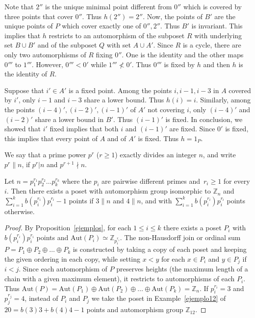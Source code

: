 \documentclass[ALCO,published]{cedram}
\renewcommand{\varphi}{h}
\newcommand{\Z}{\mathbb{Z}}
\newcommand{\aut}{\textrm{Aut}}
\begin{document}
\begin{ej}
Note that $2''$ is the unique minimal point different from $0''$ which is covered by three points that cover $0''$. Thus $\varphi(2'')=2''$. Now, the points of $B'$ are the unique points of $P$ which cover exactly one of $0'',2''$. Thus $B'$ is invariant. This implies that $\varphi$ restricts to an automorphism of the subposet $R$ with underlying set $B\cup B'$ and of the subposet $Q$ with set $A\cup A'$.
Since $R$ is a cycle, there are only two automorphisms of $R$ fixing $0''$. One is the identity and the other maps $0'''$ to $1'''$. However, $0'''<0'$ while $1'''\nless 0'$. Thus $0'''$ is fixed by $\varphi$ and then $\varphi$ is the identity of $R$. 

Suppose that $i'\in A'$ is a fixed point. Among the points $i,i-1,i-3$ in $A$ covered by $i'$, only $i-1$ and $i-3$ share a lower bound. Thus $\varphi(i)=i$. Similarly, among the points $(i-4)',(i-2)',(i-1)'$ of $A'$ not covering $i$, only $(i-4)'$ and $(i-2)'$ share a lower bound in $B'$. Thus $(i-1)'$ is fixed. In conclusion, we showed that $i'$ fixed implies that both $i$ and $(i-1)'$ are fixed. Since $0'$ is fixed, this implies that every point of $A$ and of $A'$ is fixed. Thus $\varphi=1_P$.  

\end{ej}

We say that a prime power $p^r$ ($r\ge 1$) exactly divides an integer $n$, and write $p^r\parallel n$, if $p^r| n$ and $p^{r+1}\nmid n$.

\begin{teo} \label{teoejemplos}
Let $n=p_1^{r_1}p_2^{r_2}\ldots p_k^{r_k}$ where the $p_i$ are pairwise different primes and~$r_i\ge 1$ for every $i$. Then there exists a poset with automorphism group isomorphic to $\Z_n$ and $\sum\limits_{i=1}^k b(p_i^{r_i})p_i^{r_i}-1$ points if $3\parallel n$ and $4\parallel n$, and with $\sum\limits_{i=1}^k b(p_i^{r_i})p_i^{r_i}$ points otherwise.
\end{teo}
\begin{proof}
By Proposition~\ref{ejemplos}, for each $1\le i\le k$ there exists a poset $P_i$ with $b(p_i^{r_i})p_i^{r_i}$ points and $\aut(P_i)\simeq \Z_{p_i^{r_i}}$. The non-Hausdorff join or ordinal sum $P=P_1\oplus P_2\oplus \ldots \oplus P_k$ is constructed by taking a copy of each poset and keeping the given ordering in each copy, while setting $x<y$ for each $x\in P_i$ and $y\in P_j$ if $i<j$. Since each automorphism of $P$ preserves heights (the maximum length of a chain with a given maximum element), it restricts to automorphisms of each $P_i$. Thus $\aut(P)=\aut(P_1)\oplus \aut(P_2) \oplus \ldots \oplus \aut(P_k)=\Z_n$. If $p_i^{r_i}=3$ and $p_j^{r_j}=4$, instead of $P_i$ and $P_j$ we take the poset in Example~\ref{ejemplo12} of $20=b(3)3+b(4)4-1$ points and automorphism group $\Z_{12}$.
\end{proof}
\end{document}
